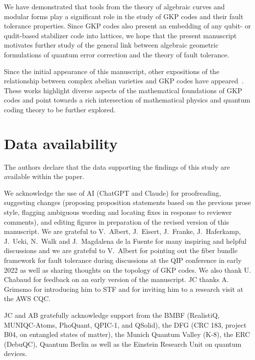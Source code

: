 \documentclass[a4paper, aps, pra, 11pt, onecolumn, tightenlines, superscriptaddress]{revtex4-2}
\begin{document}
We have demonstrated that tools from the theory of algebraic curves and modular forms play a significant role in the study of GKP codes and their fault tolerance properties. 
Since GKP codes also present an embedding of any qubit- or qudit-based stabilizer code into lattices, we hope that the present manuscript motivates further study of the general link between algebraic geometric formulations of quantum error correction and the theory of fault tolerance.
\medskip

Since the initial appearance of this manuscript, other expositions of the relationship between complex abelian varieties and GKP codes have appeared~\cite{Burchards_GeometricGKP, joseph2025generalizedgottesmankitaevpreskillstatesquantum, Conrad2024Fabulous, mayrand2026complexabelianvarietiesquantum}. These works highlight diverse aspects of the mathematical foundations of GKP codes and point towards a rich intersection of mathematical physics and quantum coding theory to be further explored.

\section*{Data availability}
The authors declare that the data supporting the findings of this study are available within the paper.

\acknowledgments
We acknowledge the use of AI (ChatGPT and Claude) for proofreading, suggesting changes (proposing proposition statements based on the previous prose style, flagging ambiguous wording and locating fixes in response to reviewer comments), and editing figures in preparation of the revised version of this manuscript.
We are grateful to %
V.\ Albert, 
J.\ Eisert, 
J.\ Franke,
J.\ Haferkamp, 
J.\ Ueki,
N.\ Walk and
J.\ Magdalena de la Fuente for many inspiring and helpful discussions and we are grateful to V.\ Albert for pointing out the fiber bundle framework for fault tolerance during discussions at the QIP conference in early 2022 as well as sharing thoughts on the topology of GKP codes. We also thank U. Chabaud for feedback on an early version of the manuscript.
JC thanks A. Grimsmo for introducing him to STF and for inviting him to a research visit at the AWS CQC.

JC and AB gratefully acknowledge support from the BMBF (RealistiQ, MUNIQC-Atoms, PhoQuant, QPIC-1, and QSolid), the DFG (CRC 183, project B04, on entangled states of matter), the Munich Quantum Valley (K-8), the ERC (DebuQC), Quantum Berlin as well as the Einstein Research Unit on quantum devices.
\end{document}
